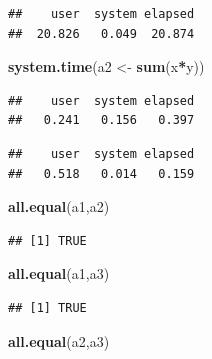 \documentclass[]{book}
\newenvironment{Shaded}{\begin{snugshade}}{\end{snugshade}}
\newcommand{\KeywordTok}[1]{\textcolor[rgb]{0.13,0.29,0.53}{\textbf{#1}}}
\newcommand{\NormalTok}[1]{#1}
\newcommand{\OperatorTok}[1]{\textcolor[rgb]{0.81,0.36,0.00}{\textbf{#1}}}
\newcommand{\StringTok}[1]{\textcolor[rgb]{0.31,0.60,0.02}{#1}}
\theoremstyle{definition}
\theoremstyle{definition}
\theoremstyle{definition}
\theoremstyle{remark}
\begin{document}
\begin{verbatim}
##    user  system elapsed 
##  20.826   0.049  20.874
\end{verbatim}

\begin{Shaded}
\begin{Highlighting}[]
\KeywordTok{system.time}\NormalTok{(a2 <-}\StringTok{ }\KeywordTok{sum}\NormalTok{(x}\OperatorTok{*}\NormalTok{y))}
\end{Highlighting}
\end{Shaded}

\begin{verbatim}
##    user  system elapsed 
##   0.241   0.156   0.397
\end{verbatim}

\begin{Shaded}
\end{Shaded}

\begin{verbatim}
##    user  system elapsed 
##   0.518   0.014   0.159
\end{verbatim}

\begin{Shaded}
\begin{Highlighting}[]
\KeywordTok{all.equal}\NormalTok{(a1,a2)}
\end{Highlighting}
\end{Shaded}

\begin{verbatim}
## [1] TRUE
\end{verbatim}

\begin{Shaded}
\begin{Highlighting}[]
\KeywordTok{all.equal}\NormalTok{(a1,a3)}
\end{Highlighting}
\end{Shaded}

\begin{verbatim}
## [1] TRUE
\end{verbatim}

\begin{Shaded}
\begin{Highlighting}[]
\KeywordTok{all.equal}\NormalTok{(a2,a3)}
\end{Highlighting}
\end{Shaded}
\end{document}
